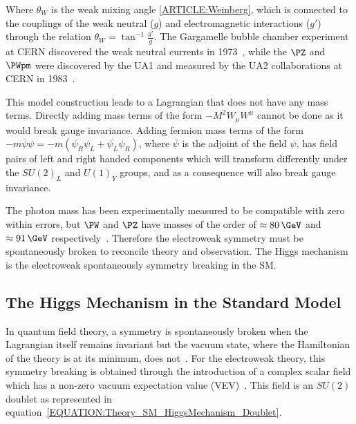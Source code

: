 Where  $\theta_{W}$ is the weak mixing angle \ref{ARTICLE:Weinberg}, which is connected to the couplings of the weak neutral ($g$) and electromagnetic interactions ($g'$) through the relation $\theta_{W}=\tan^{-1}{\frac{g'}{g}}$. The Gargamelle bubble chamber experiment at CERN discovered the weak neutral currents in 1973~\cite{ARTICLE:GargamelleNeutrinoObservation}, while the $\PZ$ and $\PWpm$ were discovered by the UA1 and measured by the UA2 collaborations at CERN in 1983~\cite{ARTICLE:UA1WObservation,ARTICLE:UA2WObservation,ARTICLE:UA1ZObservation,ARTICLE:UA2ZObservation}.

This model construction leads to a Lagrangian that does not have any mass terms. Directly adding mass terms of the form $-M^{2}W_{\mu}W^{\mu}$ cannot be done as it would break gauge invariance. Adding fermion mass terms of the form $-m\overline{\psi}\psi = -m(\overline{\psi_{R}}\psi_{L} + \overline{\psi_{L}}\psi_{R})$, where $\overline\psi$ is the adjoint of the field $\psi$, has field pairs of left and right handed components which will transform differently under the $SU(2)_{L}$ and $U(1)_{Y}$ groups, and as a consequence will also break gauge invariance.

The photon mass has been experimentally measured to be compatible with zero within errors, but $\PW$ and $\PZ$ have masses of the order of $\approx 80\,\GeV$ and $\approx91\,\GeV$ respectively~\cite{ARTICLE:PDG2014}. Therefore the electroweak symmetry must be spontaneously broken to reconcile theory and observation. The Higgs mechanism is the electroweak spontaneously symmetry breaking in the \gls{SM}.

\subsection{The Higgs Mechanism in the Standard Model}
\label{SUBSECTION:Theory_SM_HiggsMechanism}


In quantum field theory, a symmetry is spontaneously broken when the Lagrangian itself remains invariant but the vacuum state, where the Hamiltonian of the theory is at its minimum, does not~\cite{ARTICLE:AitchisonGaugeTheories}. For the electroweak theory, this symmetry breaking is obtained through the introduction of a complex scalar field which has a non-zero vacuum expectation value (VEV)~\cite{ARTICLE:HiggsBrokenSymmetries1,ARTICLE:HiggsBrokenSymmetries2,ARTICLE:GlobalConservation,ARTICLE:HiggsSpontaneousSymmetryBreakdown,ARTICLE:SymmetryBreaking}. This field is an $SU(2)$ doublet as represented in equation~\ref{EQUATION:Theory_SM_HiggsMechanism_Doublet}.


